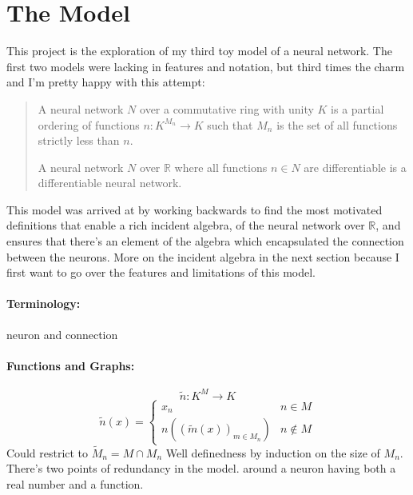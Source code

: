 
\chapter{The Model}
This project is the exploration of my third toy model of a neural network.
The first two models were lacking in features and notation,
but third times the charm and I'm pretty happy with this attempt:

%
\begin{quote}
A neural network $N$ over a commutative ring with unity $K$ is a partial ordering of functions $n:K^{M_n}\rightarrow K$ such that $M_n$ is the set of all functions strictly less than $n$.

A neural network $N$ over $\mathbb{R}$ where all functions $n\in N$ are differentiable is a differentiable neural network.
\end{quote}
This model was arrived at by working backwards to find the most motivated definitions that enable a rich incident algebra,
of the neural network over $\mathbb{R}$,
and ensures that there's an element of the algebra which encapsulated the connection between the neurons.
More on the incident algebra in the next section because I first want to go over the features and limitations of this model.

\subsubsection{Terminology:}
neuron and connection

\subsubsection{Functions and Graphs:}
\[\tilde{n}:K^M\rightarrow K\]
\[
	\tilde{n}(x) = \begin{cases} x_n & n\in M\\ n((\tilde{m}(x))_{m\in M_n}) & n\notin M\end{cases}
\]
Could restrict to $\tilde{M}_n = M\cap M_n$
Well definedness by induction on the size of $M_n$.
There's two points of redundancy in the model.
around a neuron having both a real number and a function.

